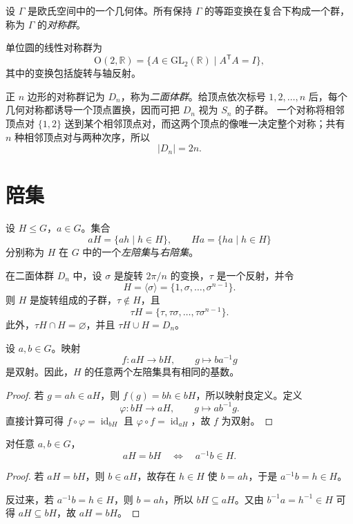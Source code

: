 \begin{definition}[几何体的对称群]
设 $\Gamma$ 是欧氏空间中的一个几何体。所有保持 $\Gamma$ 的等距变换在复合下构成一个群，称为 $\Gamma$ 的\emph{对称群}。
\end{definition}

单位圆的线性对称群为
\[
  \mathrm{O}(2,\mathbb R)
  =\{A\in\mathrm{GL}_2(\mathbb R)\mid A^{\mathsf T}A=I\},
\]
其中的变换包括旋转与轴反射。

正 $n$ 边形的对称群记为 $D_n$，称为\emph{二面体群}。给顶点依次标号
$1,2,\dots,n$ 后，每个几何对称都诱导一个顶点置换，因而可把 $D_n$ 视为 $S_n$ 的子群。
一个对称将相邻顶点对 $\{1,2\}$ 送到某个相邻顶点对，而这两个顶点的像唯一决定整个对称；共有 $n$ 种相邻顶点对与两种次序，所以
\[
  |D_n|=2n.
\]

\section{陪集}

\begin{definition}[左陪集与右陪集]
设 $H\leq G$，$a\in G$。集合
\[
  aH=\{ah\mid h\in H\},
  \qquad
  Ha=\{ha\mid h\in H\}
\]
分别称为 $H$ 在 $G$ 中的一个\emph{左陪集}与\emph{右陪集}。
\end{definition}

\begin{example}
在二面体群 $D_n$ 中，设 $\sigma$ 是旋转 $2\pi/n$ 的变换，$\tau$ 是一个反射，并令
\[
  H=\langle\sigma\rangle
  =\{1,\sigma,\dots,\sigma^{n-1}\}.
\]
则 $H$ 是旋转组成的子群，$\tau\notin H$，且
\[
  \tau H=\{\tau,\tau\sigma,\dots,\tau\sigma^{n-1}\}.
\]
此外，$\tau H\cap H=\varnothing$，并且 $\tau H\cup H=D_n$。
\end{example}

\begin{proposition}
设 $a,b\in G$。映射
\[
  f\colon aH\longrightarrow bH,
  \qquad g\longmapsto ba^{-1}g
\]
是双射。因此，$H$ 的任意两个左陪集具有相同的基数。
\end{proposition}

\begin{proof}
若 $g=ah\in aH$，则 $f(g)=bh\in bH$，所以映射良定义。定义
\[
  \varphi\colon bH\longrightarrow aH,
  \qquad g\longmapsto ab^{-1}g.
\]
直接计算可得 $f\circ\varphi=\operatorname{id}_{bH}$ 且
$\varphi\circ f=\operatorname{id}_{aH}$，故 $f$ 为双射。
\end{proof}

\begin{proposition}[左陪集相等的判别]
对任意 $a,b\in G$，
\[
  aH=bH\quad\Longleftrightarrow\quad a^{-1}b\in H.
\]
\end{proposition}

\begin{proof}
若 $aH=bH$，则 $b\in aH$，故存在 $h\in H$ 使 $b=ah$，于是 $a^{-1}b=h\in H$。

反过来，若 $a^{-1}b=h\in H$，则 $b=ah$，所以 $bH\subseteq aH$。又由
$b^{-1}a=h^{-1}\in H$ 可得 $aH\subseteq bH$，故 $aH=bH$。
\end{proof}
